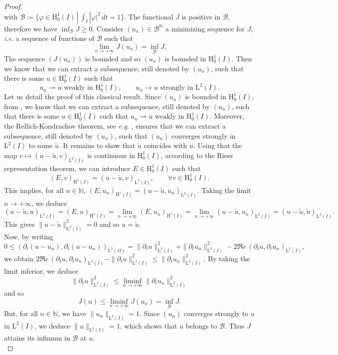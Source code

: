 \documentclass[11pt,a4paper]{report}
\newcommand{\Om}{\Omega}
\newcommand{\mrm}[1]{\mathrm{#1}}
\newcommand{\N}{\mathbb{N}}
\newcommand{\mL}{\mrm{L}}
\newcommand{\mH}{\mrm{H}}
\begin{document}
\begin{proof}
\[\]
with $\mathscr{B}\coloneqq\{\varphi\in\mH^1_0(I)\,|\,\int_I |\varphi|^2\,dt=1\}$. The functional $J$ is positive in $\mathscr{B}$, therefore we have $\inf_\mathscr{B} J \ge0$. Consider $(u_n)\in \mathscr{B}^{\N}$ a minimizing sequence for $J$, \textit{i.e.} a sequence of functions of $\mathscr{B}$ such that 
\[
\lim_{n\to+\infty}J(u_n)=\inf_\mathscr{B} J.
\]
The sequence $(J(u_n))$ is bounded and so $(u_n)$ is bounded in $\mH^1_0(I)$. Then we know that we can extract a subsequence, still denoted by $(u_n)$, such that there is some $u\in \mH^1_0(I)$ such that
\[
u_n \rightharpoonup u \text{ weakly in } \mH^1_0(I),\qquad u_n \rightarrow u \text{ strongly in } \mL^2(I).
\]
Let us detail the proof of this classical result. Since $(u_n)$ is bounded in $\mH^1_0(I)$, from \cite[Thm.\,3.17]{Brez11}, we know that we can extract a subsequence, still denoted by $(u_n)$, such that there is some $u\in \mH^1_0(I)$ such that $
u_n \rightharpoonup u \text{ weakly in } \mH^1_0(I)$. 
Moreover, the Rellich-Kondrachov theorem, see \textit{e.g.} \cite[Thm.\,9.16+Rmk.\,9.20]{Brez11}, ensures that we can extract a subsequence, still denoted by $(u_n)$, such that $(u_n)$ converges strongly in $\mL^2(I)$ to some $\tilde{u}$. It remains to show that $\tilde{u}$ coincides with $u$. Using that the map $v\mapsto (u-\tilde{u},v)_{\mL^2(I)}$ is continuous in $\mH^1_0(I)$, according to the Riesz representation theorem, we can introduce $E\in\mH^1_0(I)$ such that
\[
(E,v)_{\mH^1(I)}=(u-\tilde{u},v)_{\mL^2(I)},\qquad\forall v\in \mH^1_0(I).
\]
This implies, for all $n\in\N$, $
(E,u_n)_{\mH^1(I)}=(u-\tilde{u},u_n)_{\mL^2(I)}$. 
Taking the limit $n\to+\infty$, we deduce 
\[
(u-\tilde{u},u)_{\mL^2(I)}=(E,u)_{\mH^1(I)}=\lim_{n\to+\infty}(E,u_n)_{\mH^1(I)}=\lim_{n\to+\infty}(u-\tilde{u},u_n)_{\mL^2(I)}=(u-\tilde{u},\tilde{u})_{\mL^2(I)}.
\]
This gives $\|u-\tilde{u}\|^2_{\mL^2(I)}=0$ and so $u=\tilde{u}$.\\
\newline 
Now, by writing 
\[
0\le (\partial_t(u-u_n),\partial_t(u-u_n))_{\mL^2(\Om)}=\|\partial_tu\|^2_{\mL^2(I)}+\|\partial_tu_n\|^2_{\mL^2(I)}-2\Re e\,(\partial_tu,\partial_tu_n)_{\mL^2(I)},
\]
we obtain $2\Re e\,(\partial_tu,\partial_tu_n)_{\mL^2(I)}-\|\partial_tu\|^2_{\mL^2(I)}\le \|\partial_t u_n\|^2_{\mL^2(I)}$. By taking the limit inferior, we deduce
\[
\|\partial_tu\|^2_{\mL^2(I)} \leq \liminf\limits_{n\to+\infty}\|\partial_tu_n\|^2_{\mL^2(I)}
\]
and so
\[
J(u)\leq \liminf\limits_{n\to+\infty} J(u_n) = \inf_\mathscr{B} J.
\]
But, for all $n\in\N$, we have $ \|u_n\|_{\mL^2(I)}=1$. Since $(u_n)$ converges strongly to $u$ in $\mL^2(I)$, we deduce $\| u\|_{\mL^2(I)}=1$, which shows that $u$ belongs to $\mathscr{B}$. Thus $J$ attains its infimum in $\mathscr{B}$ at $u$.\\

\end{proof}
\end{document}
